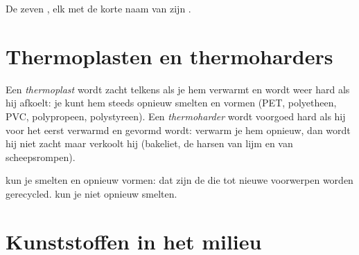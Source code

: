 \begin{omfigure}

{\small De zeven , elk met de korte naam van zijn
.}
\end{omfigure}

\section{Thermoplasten en thermoharders}

\begin{definition}\label{def:g8:plastics:thermoplastic}
Een \emph{thermoplast} wordt zacht telkens als je hem
verwarmt en wordt weer hard als hij afkoelt: je kunt hem steeds opnieuw
smelten en vormen (PET, polyetheen, PVC, polypropeen, polystyreen). Een
\emph{thermoharder} wordt voorgoed hard als hij voor
het eerst verwarmd en gevormd wordt: verwarm je hem opnieuw, dan wordt
hij niet zacht maar verkoolt hij (bakeliet, de harsen van lijm en van
scheepsrompen).
\end{definition}

\begin{remark}\label{rem:g8:plastics:which}
 kun je smelten en opnieuw vormen: dat zijn de 
die tot nieuwe voorwerpen worden gerecycled.  kun je niet
opnieuw smelten.
\end{remark}

\section{Kunststoffen in het milieu}

